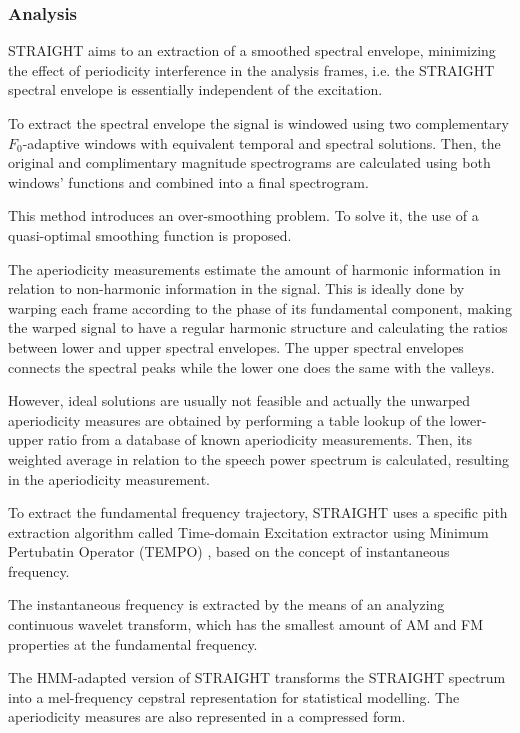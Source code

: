 \subsubsection{Analysis}
\label{vocoders_straight_analysis}
STRAIGHT aims to an extraction of a smoothed spectral envelope, minimizing the effect of periodicity interference in the analysis frames, i.e. the STRAIGHT spectral envelope is essentially independent of the excitation.

To extract the spectral envelope the signal is windowed using two complementary $F_{0}$-adaptive windows with equivalent temporal and spectral solutions.
%
Then, the original and complimentary magnitude spectrograms are calculated using both windows' functions and combined into a final spectrogram.

This method introduces an over-smoothing problem.
% 
To solve it, the use of a quasi-optimal smoothing function is proposed.

The aperiodicity measurements estimate the amount of harmonic information in relation to non-harmonic information in the signal.
%
This is ideally done by warping each frame according to the phase of its fundamental component, making the warped signal to have a regular harmonic structure and calculating the ratios between lower and upper spectral envelopes.
%
The upper spectral envelopes connects the spectral peaks while the lower one does the same with the valleys.

However, ideal solutions are usually not feasible and actually the unwarped aperiodicity measures are obtained by performing a table lookup of the lower-upper ratio from a database of known aperiodicity measurements.
%
Then, its weighted average in relation to the speech power spectrum is calculated, resulting in the aperiodicity measurement.

To extract the fundamental frequency trajectory, STRAIGHT uses a specific pith extraction algorithm called Time-domain Excitation extractor using Minimum Pertubatin Operator (TEMPO) \cite{kawahara1999restructuring}, based on the concept of instantaneous frequency.

The instantaneous frequency is extracted by the means of an analyzing continuous wavelet transform, which has the smallest amount of AM and FM properties at the fundamental frequency.

The HMM-adapted version of STRAIGHT transforms the STRAIGHT spectrum into a mel-frequency cepstral representation for statistical modelling.
%
The aperiodicity measures are also represented in a compressed form.

